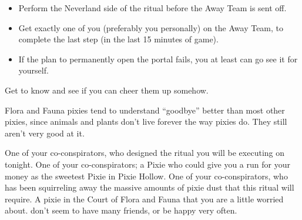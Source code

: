 \documentclass[char]{PP}
\begin{document}
\begin{itemz}
	\item 
	\begin{itemize}
		\item Perform the Neverland side of the ritual before the Away Team is sent off.
		\item Get exactly one of you (preferably you personally) on the Away Team, to complete the last step (in the last 15 minutes of game).
		\item If the plan to permanently open the portal fails, you at least can go see it for yourself.
	\end{itemize}
	\item Get to know \cFWanabe{} and see if you can cheer them up somehow.
\end{itemz}

\begin{itemz}[Notes]
	\item Flora and Fauna pixies tend to understand ``goodbye'' better than most other pixies, since animals and plants don’t live forever the way pixies do. They still aren't very good at it.
\end{itemz}

\begin{contacts}
	\contact{\cSLibrarian{}} One of your co-conspirators, who designed the ritual you will be executing on tonight.
	\contact{\cESweet{}} One of your co-conspirators; a Pixie who could give you a run for your money as the sweetest Pixie in Pixie Hollow.
	\contact{\cMIron{}} One of your co-conspirators, who has been squirreling away the massive amounts of pixie dust that this ritual will require.
	\contact{\cFWanabe{}} A pixie in the Court of Flora and Fauna that you are a little worried about. \cFWanabe{\They} do\cFWanabe{\verbes}n’t seem to have many friends, or be happy very often.
\end{contacts}
\end{document}
